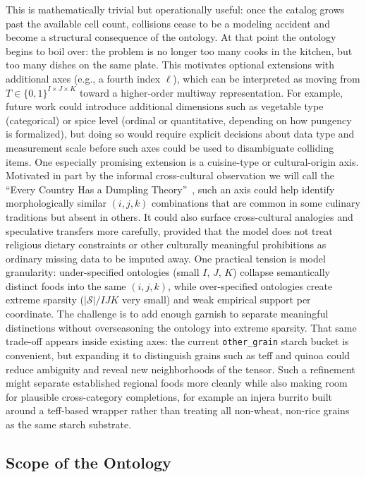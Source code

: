 This is mathematically trivial but operationally useful: once the catalog grows past the available cell count, collisions cease to be a modeling accident and become a structural consequence of the ontology.
At that point the ontology begins to boil over: the problem is no longer too many cooks in the kitchen, but too many dishes on the same plate.
This motivates optional extensions with additional axes (e.g., a fourth index $\ell$), which can be interpreted as moving from $T \in \{0,1\}^{I \times J \times K}$ toward a higher-order multiway representation.
For example, future work could introduce additional dimensions such as vegetable type (categorical) or spice level (ordinal or quantitative, depending on how pungency is formalized), but doing so would require explicit decisions about data type and measurement scale before such axes could be used to disambiguate colliding items.
One especially promising extension is a cuisine-type or cultural-origin axis. Motivated in part by the informal cross-cultural observation we will call the ``Every Country Has a Dumpling Theory''~\cite{ask_europe_dumpling}, such an axis could help identify morphologically similar $(i,j,k)$ combinations that are common in some culinary traditions but absent in others. It could also surface cross-cultural analogies and speculative transfers more carefully, provided that the model does not treat religious dietary constraints or other culturally meaningful prohibitions as ordinary missing data to be imputed away.
One practical tension is model granularity: under-specified ontologies (small $I$, $J$, $K$) collapse semantically distinct foods into the same $(i,j,k)$, while over-specified ontologies create extreme sparsity ($|\mathcal{S}|/IJK$ very small) and weak empirical support per coordinate.
The challenge is to add enough garnish to separate meaningful distinctions without overseasoning the ontology into extreme sparsity.
That same trade-off appears inside existing axes: the current \texttt{other\_grain} starch bucket is convenient, but expanding it to distinguish grains such as teff and quinoa could reduce ambiguity and reveal new neighborhoods of the tensor. Such a refinement might separate established regional foods more cleanly while also making room for plausible cross-category completions, for example an injera burrito built around a teff-based wrapper rather than treating all non-wheat, non-rice grains as the same starch substrate.

\subsection{Scope of the Ontology}
\label{sec:candy-salad-discussion}

